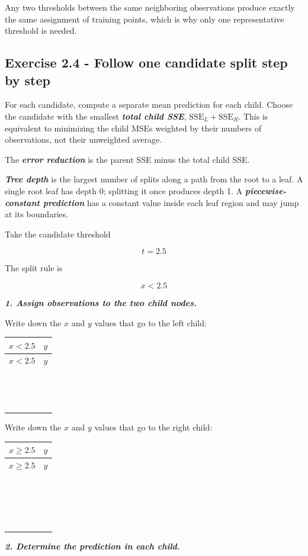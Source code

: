 \documentclass[10pt]{article}
\begin{document}
Any two thresholds between the same neighboring observations produce
exactly the same assignment of training points, which is why only one
representative threshold is needed.

\par\endgroup

\subsection*{Exercise 2.4 - Follow one candidate split step by step}
For each candidate, compute a separate mean prediction for each child. Choose the candidate with the smallest \textbf{\textit{total child SSE}}, $\mathrm{SSE}_L+\mathrm{SSE}_R$. This is equivalent to minimizing the child MSEs weighted by their numbers of observations, not their unweighted average.

The \textbf{\textit{error reduction}} is the parent SSE minus the total child SSE.

\textbf{\textit{Tree depth}} is the largest number of splits along a path from the root to a leaf. A single root leaf has depth 0; splitting it once produces depth 1. A \textbf{\textit{piecewise-constant prediction}} has a constant value inside each leaf region and may jump at its boundaries.

Take the candidate threshold

\[
t=2.5
\]

The split rule is

\[
x<2.5
\]

\textbf{\textit{1. Assign observations to the two child nodes.}}

Write down the $x$ and $y$ values that go to the left child:

\begingroup
\small
\setlength{\tabcolsep}{4pt}
\begin{longtable}{l|l}
$x<2.5$ & $y$ \\
\hline
\endfirsthead
$x<2.5$ & $y$ \\
\hline
\endhead
$\phantom{0}$ & $\phantom{0}$ \\[3pt]
$\phantom{0}$ & $\phantom{0}$ \\[3pt]
$\phantom{0}$ & $\phantom{0}$ \\[3pt]
\end{longtable}
\endgroup
Write down the $x$ and $y$ values that go to the right child:

\begingroup
\small
\setlength{\tabcolsep}{4pt}
\begin{longtable}{l|l}
$x\geq 2.5$ & $y$ \\
\hline
\endfirsthead
$x\geq 2.5$ & $y$ \\
\hline
\endhead
$\phantom{0}$ & $\phantom{0}$ \\[3pt]
$\phantom{0}$ & $\phantom{0}$ \\[3pt]
$\phantom{0}$ & $\phantom{0}$ \\[3pt]
$\phantom{0}$ & $\phantom{0}$ \\[3pt]
\end{longtable}
\endgroup
\textbf{\textit{2. Determine the prediction in each child.}}
\end{document}
